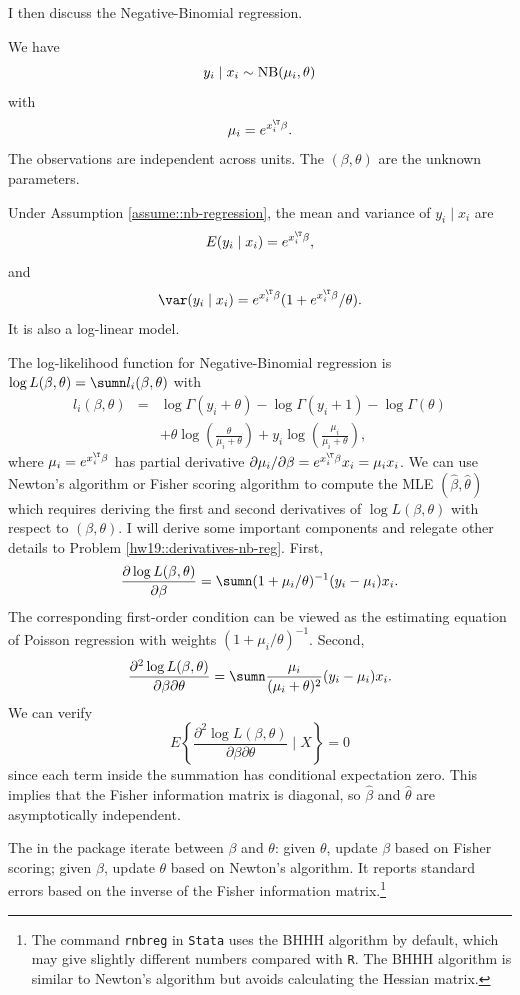 I then discuss the Negative-Binomial regression.

\begin{assumption}
\label{assume::nb-regression}
We have 
$$
y_{i}  \mid x_{i} \sim\textup{NB}(\mu_{i},\theta)
$$
with 
$$
\mu_{i} =e^{x_{i}^{\T}\beta}.
$$
The observations are independent across units. The $(\beta, \theta)$ are the unknown parameters. 
\end{assumption}


Under Assumption \ref{assume::nb-regression}, the mean and variance of $y_{i}\mid x_{i}$ are
$$
E (y_{i}  \mid x_{i} ) = e^{x_{i}^{\T}\beta} ,
$$
and
$$
\var (y_{i}  \mid x_{i} ) = e^{x_{i}^{\T}\beta} (1+e^{x_{i}^{\T}\beta} / \theta) . 
$$
It is also a log-linear model. 

The log-likelihood function for Negative-Binomial regression is $\log L(\beta, \theta) = \sumn l_i(\beta, \theta)$ with
\begin{eqnarray*}
 l_i(\beta, \theta)  
&=&     \log \Gamma(y_i+\theta) - \log \Gamma(y_i + 1) - \log \Gamma(\theta)    \\
 && + \theta\log \left( \frac{\theta}{\mu_i +\theta} \right) + y_i \log \left( \frac{ \mu_i  }{ \mu_i  + \theta} \right) , 
\end{eqnarray*}
where $\mu_i  = e^{x_{i}^{\T}\beta}$ has partial derivative $\partial \mu_i / \partial \beta =  e^{x_{i}^{\T}\beta} x_i =  \mu_i x_i$. 
We can use Newton's algorithm or Fisher scoring algorithm to compute the MLE $(\hat\beta, \hat\theta)$ which requires deriving the first and second derivatives of $\log L(\beta, \theta)$ with respect to $(\beta, \theta)$. I will derive some important components and relegate other details to Problem \ref{hw19::derivatives-nb-reg}. First,
$$
\frac{ \partial \log L(\beta, \theta) }{\partial \beta} =
\sumn  (1+ \mu_i/\theta )^{-1} (y_i - \mu_i) x_i. 
$$
The corresponding first-order condition can be viewed as the estimating equation of Poisson regression with weights $  (1+ \mu_i/\theta )^{-1}$. Second,
$$
\frac{ \partial ^2 \log L(\beta, \theta) }{\partial \beta \partial \theta}
= \sumn  \frac{  \mu_i   }{  (\mu_i + \theta)^2  } (y_i - \mu_i) x_i.
$$
We can verify
$$
E\left\{ \frac{ \partial ^2 \log L(\beta, \theta) }{\partial \beta \partial \theta}  \mid X \right\} = 0
$$
since each term inside the summation has conditional expectation zero. This implies that the Fisher information matrix is diagonal, so $\hat\beta$ and $ \hat\theta$ are asymptotically independent. 

The  in the  package iterate between $\beta$ and $\theta$: given $\theta$, update $\beta$ based on Fisher scoring; given $\beta$, update $\theta$ based on Newton's algorithm. It reports standard errors based on the inverse of the Fisher information matrix.\footnote{
The command \texttt{rnbreg}   in \texttt{Stata} uses the BHHH algorithm by default, which may give slightly different numbers compared with \texttt{R}. The BHHH algorithm is similar to Newton's algorithm but avoids calculating the Hessian matrix. 
}
 

